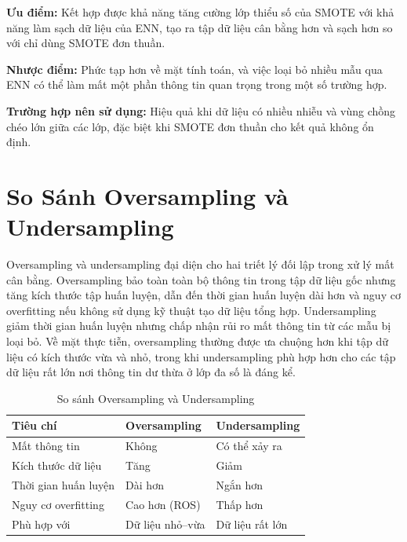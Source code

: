 \textbf{Ưu điểm:} Kết hợp được khả năng tăng cường lớp thiểu số của SMOTE với khả năng làm sạch dữ liệu của ENN, tạo ra tập dữ liệu cân bằng hơn và sạch hơn so với chỉ dùng SMOTE đơn thuần.

\textbf{Nhược điểm:} Phức tạp hơn về mặt tính toán, và việc loại bỏ nhiều mẫu qua ENN có thể làm mất một phần thông tin quan trọng trong một số trường hợp.

\textbf{Trường hợp nên sử dụng:} Hiệu quả khi dữ liệu có nhiều nhiễu và vùng chồng chéo lớn giữa các lớp, đặc biệt khi SMOTE đơn thuần cho kết quả không ổn định.

\section{So Sánh Oversampling và Undersampling}

Oversampling và undersampling đại diện cho hai triết lý đối lập trong xử lý mất cân bằng. Oversampling bảo toàn toàn bộ thông tin trong tập dữ liệu gốc nhưng tăng kích thước tập huấn luyện, dẫn đến thời gian huấn luyện dài hơn và nguy cơ overfitting nếu không sử dụng kỹ thuật tạo dữ liệu tổng hợp. Undersampling giảm thời gian huấn luyện nhưng chấp nhận rủi ro mất thông tin từ các mẫu bị loại bỏ. Về mặt thực tiễn, oversampling thường được ưa chuộng hơn khi tập dữ liệu có kích thước vừa và nhỏ, trong khi undersampling phù hợp hơn cho các tập dữ liệu rất lớn nơi thông tin dư thừa ở lớp đa số là đáng kể.

\begin{table}[h]
\centering
\caption{So sánh Oversampling và Undersampling}
\label{tab:over_under}
\renewcommand{\arraystretch}{1.35}
\begin{tabularx}{\textwidth}{lXX}
\toprule
\textbf{Tiêu chí} & \textbf{Oversampling} & \textbf{Undersampling} \\
\midrule
Mất thông tin     & Không                 & Có thể xảy ra \\
Kích thước dữ liệu & Tăng                 & Giảm \\
Thời gian huấn luyện & Dài hơn            & Ngắn hơn \\
Nguy cơ overfitting  & Cao hơn (ROS)      & Thấp hơn \\
Phù hợp với         & Dữ liệu nhỏ--vừa   & Dữ liệu rất lớn \\
\bottomrule
\end{tabularx}
\end{table}

